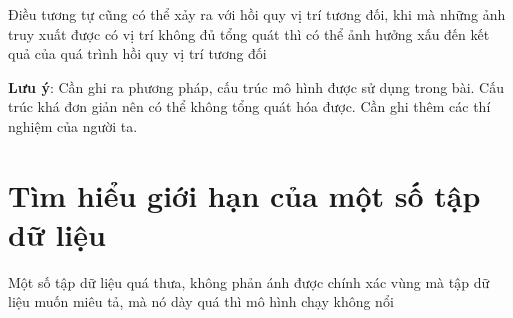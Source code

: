 Điều tương tự cũng có thể xảy ra với hồi quy vị trí tương đối, khi mà những ảnh truy xuất được có vị trí không đủ tổng quát thì có thể ảnh hưởng xấu đến kết quả của quá trình hồi quy vị trí tương đối

\textbf{Lưu ý}: Cần ghi ra phương pháp, cấu trúc mô hình được sử dụng trong bài. Cấu trúc khá đơn giản nên có thể không tổng quát hóa được. Cần ghi thêm các thí nghiệm của người ta.

\section{Tìm hiểu giới hạn của một số tập dữ liệu}
Một số tập dữ liệu quá thưa, không phản ánh được chính xác vùng mà tập dữ liệu muốn miêu tả, mà nó dày quá thì mô hình chạy không nổi\cite{berton2022rethinking}
